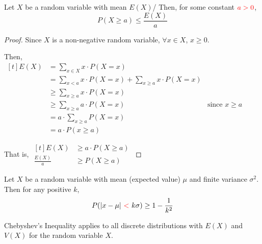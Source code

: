 \begin{theorem}
    Let $X$ be a  random variable with mean $E(X)$/ Then, for some constant $\color{red} a > 0$, $$P(X \ge a) \le \frac{E(X)}{a}$$
\end{theorem}

\begin{proof}
    Since $X$ is a non-negative random variable, $\forall x \in X$, $x \ge 0$. 

    Then, $\begin{aligned}[t]
        E(X) & = \sum_{x \in X} x \cdot P(X = x)                                 \\
             & = \sum_{x < a} x \cdot P(X = x) + \sum_{x \ge a} x \cdot P(X = x) \\
             & \ge \sum_{x \ge a} x \cdot P(X = x)                               \\
             & \ge \sum_{x \ge a} a \cdot P(X = x) & \text{since } x \ge a       \\
             & = a \cdot \sum_{x \ge a} P(X = x)                                 \\
             & = a \cdot P(x \ge a)
    \end{aligned}$

    That is, $\begin{aligned}[t]
        E(X)           & \ge a \cdot P(X \ge a) \\
        \frac{E(X)}{a} & \ge P(X \ge a)
    \end{aligned}$
\end{proof}

\begin{theorem}
    Let $X$ be a random variable with mean (expected value) $\mu$ and finite variance $\sigma^2$. Then for any positive $k$, $$P(|x - \mu| {\color{red}~<~} k\sigma) \ge 1 - \frac{1}{k^2}$$

    Chebyshev's Inequality applies to all discrete distributions with  $E(X)$ and $V(X)$ for the random variable $X$. 
\end{theorem}

